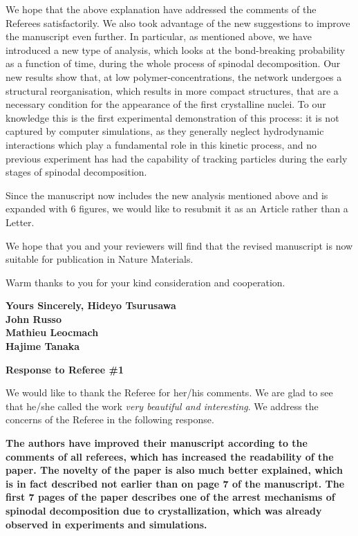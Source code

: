 \documentclass[11pt,a4paper]{article}
\newenvironment{referee}%
{\bigskip\singlespacing\bf}%
{\par\bigskip}
\begin{document}
We hope that the above explanation have addressed the comments of the Referees satisfactorily. We also took advantage of the new suggestions to improve the manuscript even further. In particular, as mentioned above, we have introduced a new type of analysis, which looks at the bond-breaking probability as a function of time, during the whole process of spinodal decomposition. Our new results show that, at low polymer-concentrations, the network undergoes a structural reorganisation, which results in more compact structures, that are a necessary condition for the appearance of the first crystalline nuclei. To our knowledge this is the first experimental demonstration of this process: it is not captured by computer simulations, as they generally neglect hydrodynamic interactions which play a fundamental role in this kinetic process, and no previous experiment has had the capability of tracking particles during the early stages of spinodal decomposition.

\vskip 0.3cm

Since the manuscript now includes the new analysis mentioned above and is expanded with 6 figures, we would like to resubmit it as an Article rather than a Letter. 
\textit{
\vskip 0.3cm}

We hope that you and your reviewers will find that the revised manuscript is now suitable for publication in Nature Materials. 

\vskip 0.5cm

Warm thanks to you for your kind consideration and cooperation. 

\vskip 0.8cm

\noindent
{\bf Yours Sincerely,
\vskip 0.3cm
\indent Hideyo Tsurusawa\\
\indent John Russo\\
\indent Mathieu Leocmach\\
\indent Hajime Tanaka}

\clearpage

\noindent
\begin{Large}
{\bf Response to Referee \#1}
\end{Large}

\vskip 0.5cm

We would like to thank the Referee for her/his comments. 
We are glad to see that he/she called the work \emph{very beautiful and interesting}. 
We address the concerns of the Referee in the following response.

\begin{referee}
The authors have improved their manuscript according to the comments of all referees, which has increased the readability of the paper. The novelty of the paper is also much better explained, which is in fact described not earlier than on page 7 of the manuscript.
The first 7 pages of the paper describes one of the arrest mechanisms of spinodal decomposition due to crystallization, which was already observed in experiments and simulations.
\end{referee}
\end{document}
